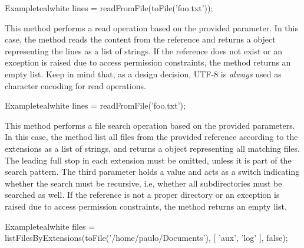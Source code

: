 \begin{description}
\begin{codebox}{Example}{teal}{\icnote}{white}
lines = readFromFile(toFile('foo.txt'));
\end{codebox}

\item[\mdbox{R}{readFromFile(String reference)}{List<String>}] This method performs a read operation based on the provided parameter. In this case, the method reads the content from the  reference and returns a  object representing the lines as a list of strings. If the reference does not exist or an exception is raised due to access permission constraints, the  method returns an empty list. Keep in mind that, as a design decision, UTF-8 is \emph{always} used as character encoding for read operations.

\begin{codebox}{Example}{teal}{\icnote}{white}
lines = readFromFile('foo.txt');
\end{codebox}

\item[\mdbox{R}{\parbox{0.61\textwidth}{listFilesByExtensions(File file,\\\hspace*{1em} List<String> extensions, boolean recursive)}}{List<File>}] This method performs a file search operation based on the provided parameters. In this case, the method list all files from the provided  reference according to the  extensions as a list of strings, and returns a  object representing all matching files. The leading full stop in each extension must be omitted, unless it is part of the search pattern. The third parameter holds a  value and acts as a switch indicating whether the search must be recursive, i.e, whether all subdirectories must be searched as well. If the reference is not a proper directory or an exception is raised due to access permission constraints, the  method returns an empty list.

\begin{codebox}{Example}{teal}{\icnote}{white}
files = listFilesByExtensions(toFile('/home/paulo/Documents'),
        [ 'aux', 'log' ], false);
\end{codebox}


\end{description}
